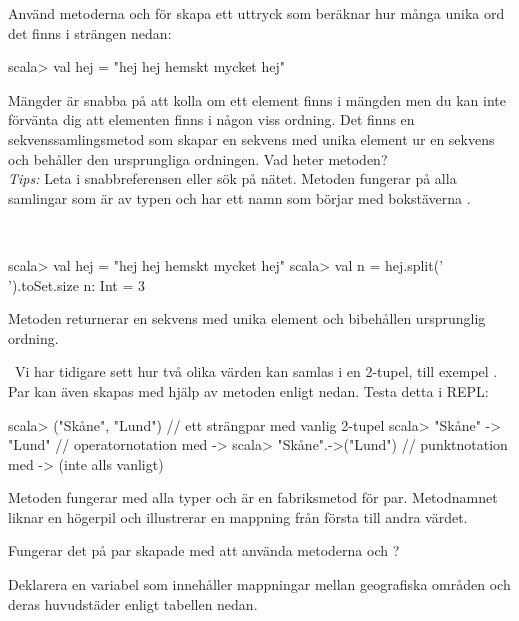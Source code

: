 \Subtask Använd metoderna  och  för skapa ett uttryck som beräknar hur många unika ord det finns i strängen  nedan:
\begin{REPLnonum}
scala> val hej = "hej hej hemskt mycket hej"
\end{REPLnonum}

\Subtask Mängder är snabba på att kolla om ett element finns i mängden men du kan inte förvänta dig att elementen finns i någon viss ordning. Det finns en sekvenssamlingsmetod som skapar en sekvens med unika element ur en sekvens och behåller den ursprungliga ordningen. Vad heter metoden? \\\emph{Tips:} Leta i snabbreferensen eller sök på nätet. Metoden fungerar på alla samlingar som är av typen  och har ett namn som börjar med bokstäverna .

\SOLUTION

\TaskSolved \what~

\SubtaskSolved
\begin{REPL}
scala> val hej = "hej hej hemskt mycket hej"
scala> val n = hej.split(' ').toSet.size
n: Int = 3
\end{REPL}

\SubtaskSolved Metoden  returnerar en sekvens med unika element och bibehållen ursprunglig ordning.

\QUESTEND





\QUESTBEGIN

\Task \what~Vi har tidigare sett hur två olika värden kan samlas i en 2-tupel, till exempel . Par kan även skapas med hjälp av metoden \code{->} enligt nedan. Testa detta i REPL:
\begin{REPL}
scala> ("Skåne", "Lund")          // ett strängpar med vanlig 2-tupel
scala> "Skåne" -> "Lund"           // operatornotation med ->
scala> "Skåne".->("Lund")         // punktnotation med -> (inte alls vanligt)
\end{REPL}
Metoden \code{->} fungerar med alla typer och är en fabriksmetod för par. Metodnamnet liknar en högerpil och illustrerar en mappning från första till andra värdet.

\Subtask Fungerar det på par skapade med \code{->} att använda metoderna  och ?


\Subtask Deklarera en variabel  som innehåller mappningar mellan geografiska områden och deras huvudstäder enligt tabellen nedan.

